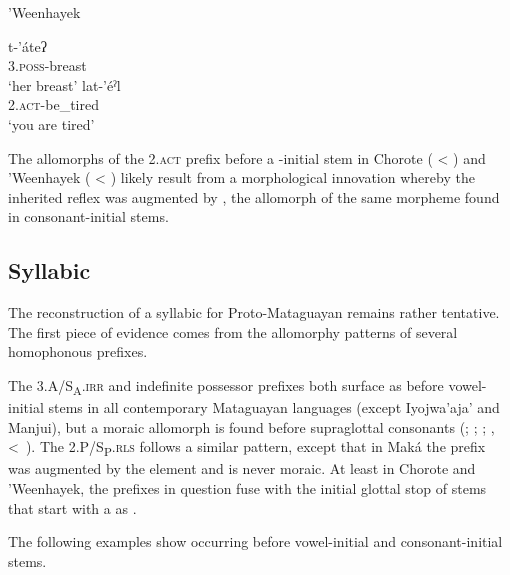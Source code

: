 \ea\label{ex:sylllh:3:whk}
    ’Weenhayek \citep[96, 123]{KC16}
    \begin{xlist}
        \ex\gll t-’áteʔ\\
                3.{\textsc{poss}}-breast\\
                \glt `her breast'
        \ex\gll lat-’éˀl \\
                2.{\textsc{act}}-be\_tired \\
                \glt `you are tired'
    \end{xlist}
\z

The allomorphs of the 2.{\textsc{act}} prefix before a \mbox{-}initial stem in Chorote ( < ) and ’Weenhayek ( < ) likely result from a morphological innovation whereby the inherited reflex  was augmented by , the allomorph of the same morpheme found in consonant-initial stems.
  
\subsection{Syllabic }\label{syllabic-n}

The reconstruction of a syllabic  for Proto-Mataguayan remains rather tentative. The first piece of evidence comes from the allomorphy patterns of several homophonous prefixes.

\begin{exe}
    \ex \thirr
    \ex \imppssr
    \ex \secrls
\end{exe}

The 3.A/S\textsubscript{A}.{\textsc{irr}} and indefinite possessor prefixes both surface as  before vowel-initial stems in all contemporary Mataguayan languages (except Iyojwa'aja' and Manjui), but a moraic allomorph is found before supraglottal consonants (; ; ; ,  <~). The 2.P/S\textsubscript{P}.{\textsc{rls}} follows a similar pattern, except that in Maká the prefix was augmented by the element  and is never moraic. At least in Chorote and 'Weenhayek, the prefixes in question fuse with the initial glottal stop of stems that start with a  as .

The following examples show  occurring before vowel-initial  and consonant-initial  stems.

